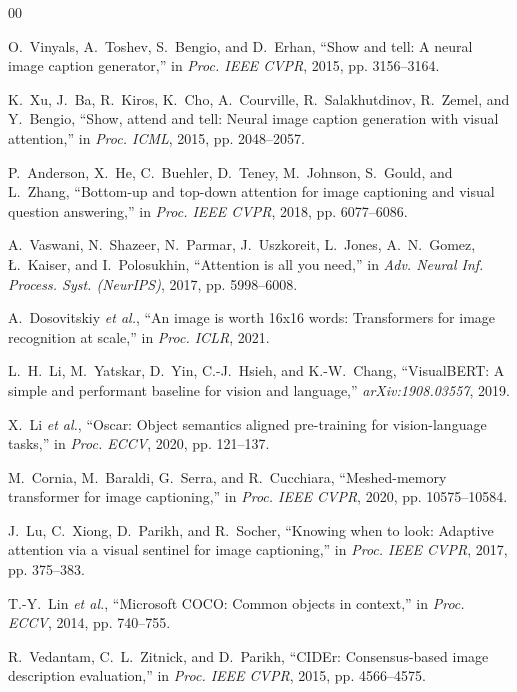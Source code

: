 \documentclass[conference]{IEEEtran}
\begin{document}
\begin{thebibliography}{00}

O.~Vinyals, A.~Toshev, S.~Bengio, and D.~Erhan, ``Show and tell: A neural image caption generator,'' in \emph{Proc. IEEE CVPR}, 2015, pp. 3156--3164.

K.~Xu, J.~Ba, R.~Kiros, K.~Cho, A.~Courville, R.~Salakhutdinov, R.~Zemel, and Y.~Bengio, ``Show, attend and tell: Neural image caption generation with visual attention,'' in \emph{Proc. ICML}, 2015, pp. 2048--2057.

P.~Anderson, X.~He, C.~Buehler, D.~Teney, M.~Johnson, S.~Gould, and L.~Zhang, ``Bottom-up and top-down attention for image captioning and visual question answering,'' in \emph{Proc. IEEE CVPR}, 2018, pp. 6077--6086.

A.~Vaswani, N.~Shazeer, N.~Parmar, J.~Uszkoreit, L.~Jones, A.~N.~Gomez, \L.~Kaiser, and I.~Polosukhin, ``Attention is all you need,'' in \emph{Adv. Neural Inf. Process. Syst. (NeurIPS)}, 2017, pp. 5998--6008.

A.~Dosovitskiy \emph{et al.}, ``An image is worth 16x16 words: Transformers for image recognition at scale,'' in \emph{Proc. ICLR}, 2021.

L.~H.~Li, M.~Yatskar, D.~Yin, C.-J.~Hsieh, and K.-W.~Chang, ``VisualBERT: A simple and performant baseline for vision and language,'' \emph{arXiv:1908.03557}, 2019.

X.~Li \emph{et al.}, ``Oscar: Object semantics aligned pre-training for vision-language tasks,'' in \emph{Proc. ECCV}, 2020, pp. 121--137.

M.~Cornia, M.~Baraldi, G.~Serra, and R.~Cucchiara, ``Meshed-memory transformer for image captioning,'' in \emph{Proc. IEEE CVPR}, 2020, pp. 10575--10584.

J.~Lu, C.~Xiong, D.~Parikh, and R.~Socher, ``Knowing when to look: Adaptive attention via a visual sentinel for image captioning,'' in \emph{Proc. IEEE CVPR}, 2017, pp. 375--383.

T.-Y.~Lin \emph{et al.}, ``Microsoft COCO: Common objects in context,'' in \emph{Proc. ECCV}, 2014, pp. 740--755.

R.~Vedantam, C.~L.~Zitnick, and D.~Parikh, ``CIDEr: Consensus-based image description evaluation,'' in \emph{Proc. IEEE CVPR}, 2015, pp. 4566--4575.


\end{thebibliography}
\end{document}
